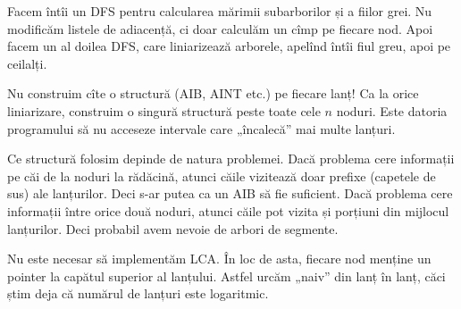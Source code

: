 \documentclass[../main.tex]{subfiles}
\begin{document}
Facem întîi un DFS pentru calcularea mărimii subarborilor și a fiilor grei. Nu modificăm listele de adiacență, ci doar calculăm un cîmp  pe fiecare nod. Apoi facem un al doilea DFS, care liniarizează arborele, apelînd întîi fiul greu, apoi pe ceilalți.

Nu construim cîte o structură (AIB, AINT etc.) pe fiecare lanț! Ca la orice liniarizare, construim o singură structură peste toate cele $n$ noduri. Este datoria programului să nu acceseze intervale care „încalecă” mai multe lanțuri.

Ce structură folosim depinde de natura problemei. Dacă problema cere informații pe căi de la noduri la rădăcină, atunci căile vizitează doar prefixe (capetele de sus) ale lanțurilor. Deci s-ar putea ca un AIB să fie suficient. Dacă problema cere informații între orice două noduri, atunci căile pot vizita și porțiuni din mijlocul lanțurilor. Deci probabil avem nevoie de arbori de segmente.

Nu este necesar să implementăm LCA. În loc de asta, fiecare nod menține un pointer la capătul superior al lanțului. Astfel urcăm „naiv” din lanț în lanț, căci știm deja că numărul de lanțuri este logaritmic.
\end{document}
